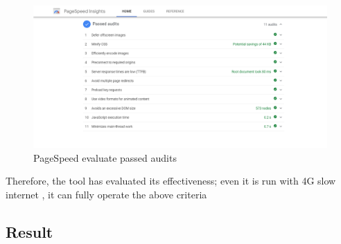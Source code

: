 \begin{center}
	\begin{figure}[H]
		\centering
		\includegraphics[width=1\columnwidth]{images/chap5/pagespeed3.PNG}
		\caption{PageSpeed evaluate passed audits}
	\end{figure}
\end{center}
 Therefore, the tool has evaluated its effectiveness; even it is run with 4G slow internet , it can fully operate the above criteria
\subsection{Result}
